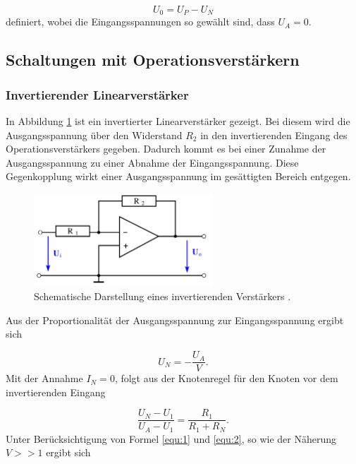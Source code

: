 \begin{equation*}
    U_0 = U_P - U_N
\end{equation*}
definiert, wobei die Eingangsspannungen so gewählt sind, dass $U_A = 0$.



\subsection{Schaltungen mit Operationsverstärkern}
\label{sec:Schaltungen}

\subsubsection{Invertierender Linearverstärker}
\label{sec:Invertierter_Linearverstärker}

In Abbildung \ref{fig:2} ist ein invertierter Linearverstärker gezeigt. 
Bei diesem wird die Ausgangsspannung über den Widerstand $R_2$ in den invertierenden Eingang des Operationsverstärkers gegeben. 
Dadurch kommt es bei einer Zunahme der Ausgangsspannung zu einer Abnahme der Eingangsspannung.
Diese Gegenkopplung wirkt einer Ausgangsspannung im gesättigten Bereich entgegen.

\begin{figure}
    \centering
        \includegraphics[width= 0.6\textwidth]{plots/Verstärker.png}
    \caption{Schematische Darstellung eines invertierenden Verstärkers \cite{Anleitung}.}
    \label{fig:2}
\end{figure}

Aus der Proportionalität der Ausgangsspannung zur Eingangsspannung ergibt sich 

\begin{equation}
    \label{equ:1}
    U_N = - \frac{U_A}{V}.
\end{equation}
Mit der Annahme $I_N = 0$, folgt aus der Knotenregel für den Knoten vor dem invertierenden Eingang

\begin{equation}
    \label{equ:2}
    \frac{U_N - U_1}{U_A - U_1} = \frac{R_1}{R_1 + R_N}.
\end{equation}
Unter Berücksichtigung von Formel \eqref{equ:1} und \eqref{equ:2}, so wie der Näherung $V >> 1$ ergibt sich

